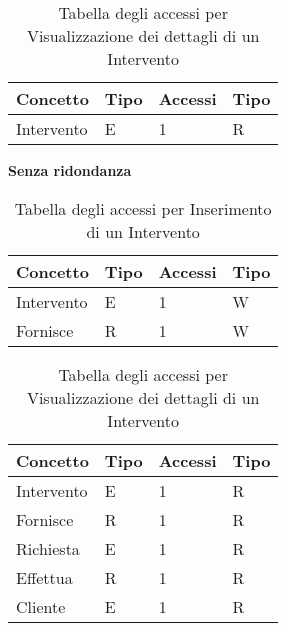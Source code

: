 \documentclass{article}
\begin{document}
\begin{table}[h]
    \centering
        \begin{adjustbox}{width=0.6\textwidth}
            \begin{tabular}{|m{2cm}|m{2cm}|m{2cm}|m{2cm}|}
                \hline  
                \textbf{Concetto} & \textbf{Tipo} & \textbf{Accessi} & \textbf{Tipo}\\ 
                \hline
                Intervento & E & 1 & R\\
                \hline
            \end{tabular}
        \end{adjustbox}
    \caption{Tabella degli accessi per Visualizzazione dei dettagli di un Intervento}
    \label{tab:accesstable10}
\end{table}

\textbf{Senza ridondanza}

\begin{table}[h]
    \centering
        \begin{adjustbox}{width=0.6\textwidth}
            \begin{tabular}{|m{2cm}|m{2cm}|m{2cm}|m{2cm}|}
                \hline  
                \textbf{Concetto} & \textbf{Tipo} & \textbf{Accessi} & \textbf{Tipo} \\ 
                \hline
                Intervento & E & 1 & W \\
                \hline
                Fornisce & R & 1 & W \\
                \hline
            \end{tabular}
        \end{adjustbox}
    \caption{Tabella degli accessi per Inserimento di un Intervento}
    \label{tab:accesstable11}
\end{table}

\begin{table}[h!]
    \centering
        \begin{adjustbox}{width=0.6\textwidth}
            \begin{tabular}{|m{2cm}|m{2cm}|m{2cm}|m{2cm}|}
                \hline  
                \textbf{Concetto} & \textbf{Tipo} & \textbf{Accessi} & \textbf{Tipo} \\ 
                \hline
                Intervento & E & 1 & R \\
                \hline
                Fornisce & R & 1 & R \\
                \hline
                Richiesta & E & 1 & R \\
                \hline
                Effettua & R & 1 & R \\
                \hline
                Cliente & E & 1 & R \\
                \hline
            \end{tabular}
        \end{adjustbox}
    \caption{Tabella degli accessi per Visualizzazione dei dettagli di un Intervento}
    \label{tab:accesstable12}
\end{table}
\end{document}
